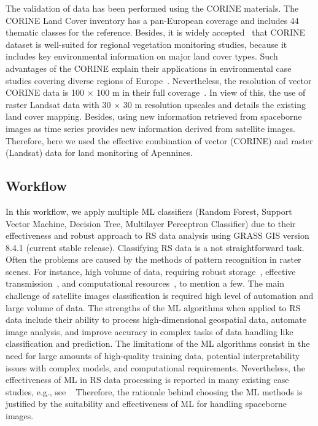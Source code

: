 \documentclass[jimaging,article,accept,pdftex,oneauthor]{Definitions/mdpi}
\begin{document}
{The validation of data has been performed using the CORINE materials. The CORINE Land Cover inventory has a pan-European coverage and includes 44 thematic classes for the reference. Besides, it is widely accepted}~\cite{land11020192,ijgi10050342,ijerph20032049} {that CORINE dataset is well-suited for regional vegetation monitoring studies, because it includes key environmental information on major land cover types. Such advantages of the CORINE explain their applications in environmental case studies covering diverse regions of Europe}~\cite{Efthimiou13122022,Vaitkus01012005,Radovic01082011,Viciani26052016}. {Nevertheless, the resolution of vector CORINE data is 100 $\times$ 100 m in their full coverage}~\cite{atmos13071050}. {In view of this, the use of raster Landsat data with 30 $\times$ 30 m resolution upscales and details the existing land cover mapping. Besides, using new information retrieved from spaceborne images as time series provides new information derived from satellite images. Therefore, here we used the effective combination of vector (CORINE) and raster (Landsat) data for land monitoring of Apennines.}

\subsection{Workflow}

{In this workflow, we apply multiple ML classifiers (Random Forest, Support Vector Machine, Decision Tree, Multilayer Perceptron Classifier) due to their effectiveness and robust approach to RS data analysis using GRASS GIS version 8.4.1 (current stable release). Classifying RS data is a not straightforward task. Often the problems are caused by the methods of pattern recognition in raster scenes. For instance, high volume of data, requiring robust storage}~\cite{Esch02012018,Corbane22122017}, {effective transmission}~\cite{10835589,578998,10525710}, {and computational resources}~\cite{7326131,7320976}, {to mention a few. The main challenge of satellite images classification is required high level of automation and large volume of data. The strengths of the ML algorithms when applied to RS data include their ability to process high-dimensional geospatial data, automate image analysis, and improve accuracy in complex tasks of data handling like classification and prediction. The limitations of the ML algorithms consist in the need for large amounts of high-quality training data, potential interpretability issues with complex models, and computational requirements. Nevertheless, the effectiveness of ML in RS data processing is reported in many existing case studies, e.g., see }~\cite{10725490,9038562,9864505,9883577} {Therefore, the rationale behind choosing the ML methods is justified by the suitability and effectiveness of ML for handling spaceborne images. }
\end{document}
